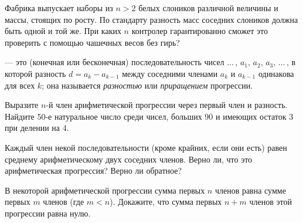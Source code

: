\documentclass[a4paper,12pt]{article}
\begin{document}



Фабрика выпускает наборы из $n>2$ белых слоников различной
величины и массы, стоящих по росту. По стандарту разность масс
соседних слоников должна быть одной и той же. При каких $n$ контролер
гарантированно сможет это проверить с помощью чашечных весов без гирь?

  --- это (конечная или бесконечная)
последовательность чисел $\ldots\,,\,a_1,\,a_2,\,a_3,\,\ldots\,$,
в которой разность $d=a_k-a_{k-1}$ между соседними членами $a_k$ и $a_{k-1}$
одинакова для всех $k$; она называется {\it разностью\/} или {\it
приращением\/} прогрессии.

Выразите $n$-й член арифметической прогрессии через
первый член и разность.
Найдите 50-е натуральное число среди чисел, больших 90 и имеющих
остаток 3 при делении на 4.

 Каждый член некой последовательности (кроме крайних, если
они есть) равен среднему арифметическому двух соседних членов.
Верно ли, что это %
арифметическая прогрессия?
Верно ли обратное?

 В некоторой арифметической прогрессии сумма первых
$n$ членов равна сумме первых $m$ членов (где $m<n$).
Докажите, что сумма первых $n+m$ членов этой прогрессии равна нулю.





\end{document}
